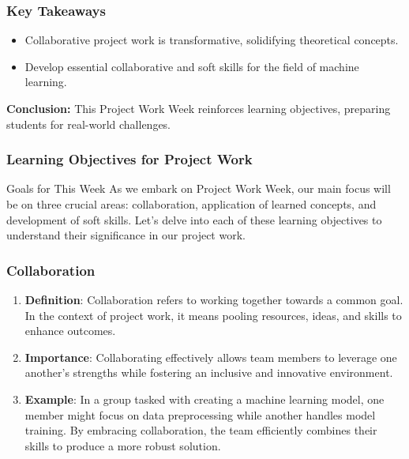 \documentclass{beamer}
\begin{document}
\begin{frame}[fragile]
    \frametitle{Key Takeaways}
    \begin{itemize}
        \item Collaborative project work is transformative, solidifying theoretical concepts.
        \item Develop essential collaborative and soft skills for the field of machine learning.
    \end{itemize}
    \textbf{Conclusion:} This Project Work Week reinforces learning objectives, preparing students for real-world challenges.
\end{frame}

\begin{frame}[fragile]
    \frametitle{Learning Objectives for Project Work}
    \begin{block}{Goals for This Week}
        As we embark on Project Work Week, our main focus will be on three crucial areas: 
        collaboration, application of learned concepts, and development of soft skills. 
        Let's delve into each of these learning objectives to understand their significance in our project work.
    \end{block}
\end{frame}

\begin{frame}[fragile]
    \frametitle{Collaboration}
    \begin{enumerate}
        \item \textbf{Definition}:
            Collaboration refers to working together towards a common goal. In the context of project work, 
            it means pooling resources, ideas, and skills to enhance outcomes.
        \item \textbf{Importance}:
            Collaborating effectively allows team members to leverage one another's strengths while fostering 
            an inclusive and innovative environment.
        \item \textbf{Example}:
            In a group tasked with creating a machine learning model, one member might focus on data 
            preprocessing while another handles model training. By embracing collaboration, the team 
            efficiently combines their skills to produce a more robust solution.
    \end{enumerate}
\end{frame}
\end{document}
